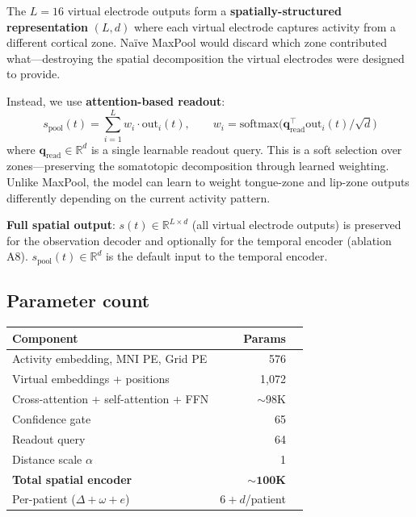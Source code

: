 \documentclass[11pt,letterpaper]{article}
\newcommand{\R}{\mathbb{R}}
\begin{document}
The $L = 16$ virtual electrode outputs form a \textbf{spatially-structured representation} $(L, d)$ where each virtual electrode captures activity from a different cortical zone. Na\"ive MaxPool would discard which zone contributed what---destroying the spatial decomposition the virtual electrodes were designed to provide.

Instead, we use \textbf{attention-based readout}:
\begin{equation}
s_{\text{pool}}(t) = \sum_{i=1}^{L} w_i \cdot \text{out}_i(t), \qquad w_i = \text{softmax}\bigl(\mathbf{q}_{\text{read}}^\top \text{out}_i(t) / \sqrt{d}\bigr)
\end{equation}
where $\mathbf{q}_{\text{read}} \in \R^d$ is a single learnable readout query. This is a soft selection over zones---preserving the somatotopic decomposition through learned weighting. Unlike MaxPool, the model can learn to weight tongue-zone and lip-zone outputs differently depending on the current activity pattern.

\textbf{Full spatial output}: $s(t) \in \R^{L \times d}$ (all virtual electrode outputs) is preserved for the observation decoder and optionally for the temporal encoder (ablation A8). $s_{\text{pool}}(t) \in \R^d$ is the default input to the temporal encoder.

\subsection{Parameter count}

\begin{table}[h]\centering\small
\begin{tabular}{@{}lrl@{}}
\toprule
\textbf{Component} & \textbf{Params} \\
\midrule
Activity embedding, MNI PE, Grid PE & 576 \\
Virtual embeddings + positions & 1,072 \\
Cross-attention + self-attention + FFN & ${\sim}$98K \\
Confidence gate & 65 \\
Readout query & 64 \\
Distance scale $\alpha$ & 1 \\
\midrule
\textbf{Total spatial encoder} & $\mathbf{{\sim}100}$\textbf{K} \\
Per-patient ($\Delta + \omega + e$) & $6 + d$/patient \\
\bottomrule
\end{tabular}
\end{table}
\end{document}
